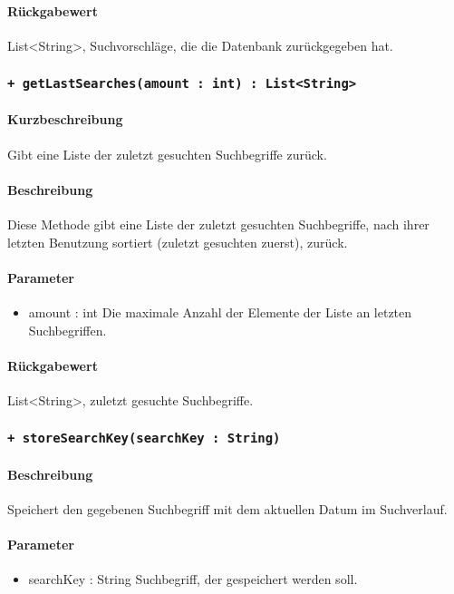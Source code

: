 \paragraph*{Rückgabewert}
List<String>, Suchvorschläge, die die Datenbank zurückgegeben hat.

 \subsubsection*{\texttt{+ getLastSearches(amount : int) : List<String>}}%
\paragraph*{Kurzbeschreibung}
Gibt eine Liste der zuletzt gesuchten Suchbegriffe zurück.
\paragraph*{Beschreibung}
Diese Methode gibt eine Liste der zuletzt gesuchten Suchbegriffe, nach ihrer letzten Benutzung sortiert (zuletzt gesuchten zuerst), zurück.
\paragraph*{Parameter}
\begin{itemize}
    \item amount : int Die maximale Anzahl der Elemente der Liste an letzten Suchbegriffen.
\end{itemize}
\paragraph*{Rückgabewert}
List<String>, zuletzt gesuchte Suchbegriffe.

 \subsubsection*{\texttt{+ storeSearchKey(searchKey : String)}}%
\paragraph*{Beschreibung}
Speichert den gegebenen Suchbegriff mit dem aktuellen Datum im Suchverlauf.
\paragraph*{Parameter}
\begin{itemize}
    \item searchKey : String Suchbegriff, der gespeichert werden soll.
\end{itemize}

